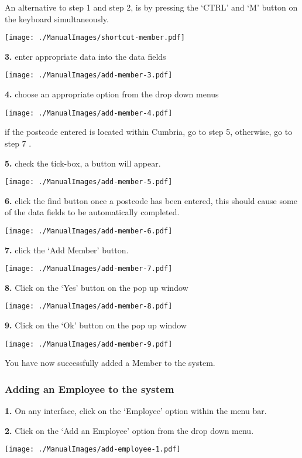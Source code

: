 An alternative to step 1 and step 2, is by pressing the `CTRL' and `M' button on the keyboard simultaneously.

\texttt{[image: ./ManualImages/shortcut-member.pdf]}

\textbf{3.} enter appropriate data into the data fields

\texttt{[image: ./ManualImages/add-member-3.pdf]}

\textbf{4.} choose an appropriate option from the drop down menus

\texttt{[image: ./ManualImages/add-member-4.pdf]}

if the postcode entered is located within Cumbria, go to step 5, otherwise, go to step 7 .

\textbf{5.} check the tick-box, a button will appear.

\texttt{[image: ./ManualImages/add-member-5.pdf]}

\textbf{6.} click the find button once a postcode has been entered, this should cause some of the data fields to be automatically completed.

\texttt{[image: ./ManualImages/add-member-6.pdf]}

\textbf{7.} click the `Add Member' button.

\texttt{[image: ./ManualImages/add-member-7.pdf]}

\textbf{8.} Click on the `Yes' button on the pop up window

\texttt{[image: ./ManualImages/add-member-8.pdf]}

\textbf{9.} Click on the `Ok' button on the pop up window

\texttt{[image: ./ManualImages/add-member-9.pdf]}

You have now successfully added a Member to the system.

\pagebreak
\subsubsection{Adding an Employee to the system}
\label{fig:Adding an Employee to the system}

\textbf{1.} On any interface, click on the `Employee' option within the menu bar.

\textbf{2.} Click on the `Add an Employee' option from the drop down menu.

\texttt{[image: ./ManualImages/add-employee-1.pdf]}

